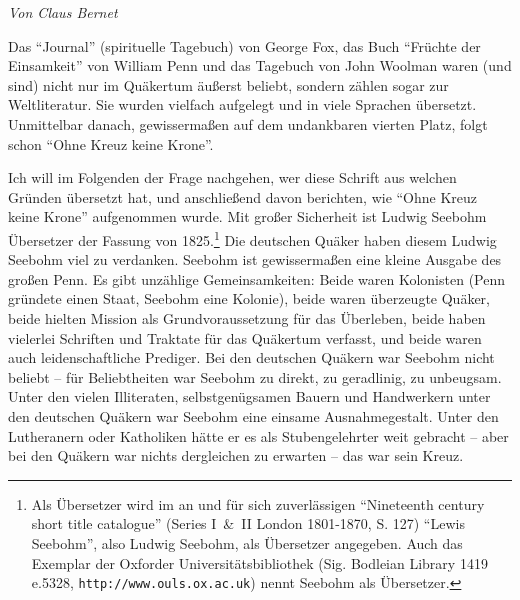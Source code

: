 
\begin{flushright}
\begin{footnotesize}
\textit{Von Claus Bernet}
\end{footnotesize}
\end{flushright}
\smallskip

Das "`Journal"' (spirituelle Tagebuch) von George Fox, das Buch "`Früchte der
Einsamkeit"' von William Penn und das Tagebuch von John Woolman waren (und sind)
nicht nur im Quäkertum äußerst beliebt, sondern zählen sogar zur Weltliteratur.
Sie wurden vielfach aufgelegt und in viele Sprachen übersetzt. Unmittelbar
danach, gewissermaßen auf dem undankbaren vierten Platz, folgt schon "`Ohne
Kreuz keine Krone"'.

\medskip

Ich will im Folgenden der Frage nachgehen, wer diese Schrift aus welchen Gründen
übersetzt hat, und anschließend davon berichten, wie "`Ohne Kreuz keine Krone"'
aufgenommen wurde. Mit großer Sicherheit ist Ludwig Seebohm Übersetzer der
Fassung von 1825.\footnote{Als Übersetzer wird im an und für sich zuverlässigen
"`Nineteenth century
short title catalogue"' (Series I~\&~II London 1801-1870, S. 127) "`Lewis
Seebohm"', also Ludwig Seebohm, als Übersetzer angegeben. Auch das Exemplar der
Oxforder Universitätsbibliothek (Sig. Bodleian Library 1419 e.5328,
\texttt{http://www.ouls.ox.ac.uk}) nennt Seebohm als Übersetzer.}%
Die deutschen Quäker haben diesem Ludwig Seebohm viel zu
verdanken. Seebohm ist gewissermaßen eine kleine Ausgabe des großen Penn. Es
gibt unzählige Gemeinsamkeiten: Beide waren Kolonisten (Penn gründete einen
Staat, Seebohm eine Kolonie), beide waren überzeugte Quäker, beide hielten
Mission als Grundvoraussetzung für das Überleben, beide haben vielerlei
Schriften und Traktate für das Quäkertum verfasst, und beide waren auch
leidenschaftliche Prediger.
Bei den deutschen Quäkern war Seebohm nicht beliebt -- für Beliebtheiten war
Seebohm zu direkt, zu geradlinig, zu unbeugsam. Unter den vielen Illiteraten,
selbstgenügsamen Bauern und Handwerkern unter den deutschen Quäkern war Seebohm
eine einsame Ausnahmegestalt. Unter den Lutheranern oder Katholiken hätte er es
als Stubengelehrter weit gebracht -- aber bei den Quäkern war nichts dergleichen
zu erwarten -- das war sein Kreuz.

\medskip

